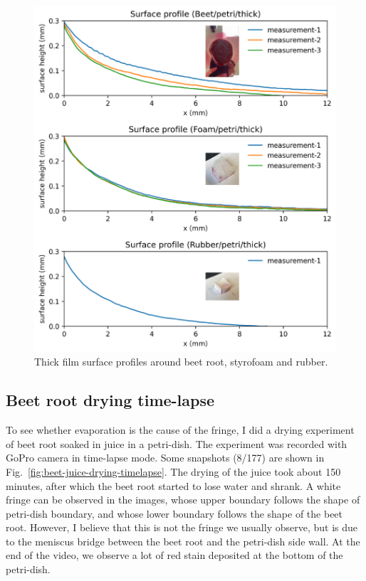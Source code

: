 \documentclass[12pt]{article}
\begin{document}
\begin{figure}
    \centering
    \includegraphics[width=\textwidth]{Figures/surface_profile_measurement_petridish_04042024.pdf}
    \caption{Thick film surface profiles around beet root, styrofoam and rubber.}
    \label{fig:thick-film-surface-profile}
\end{figure}

\subsection{Beet root drying time-lapse}

To see whether evaporation is the cause of the fringe, I did a drying experiment of beet root soaked in juice in a petri-dish. The experiment was recorded with GoPro camera in time-lapse mode. Some snapshots (8/177) are shown in Fig.~\ref{fig:beet-juice-drying-timelapse}. The drying of the juice took about 150 minutes, after which the beet root started to lose water and shrank. A white fringe can be observed in the images, whose upper boundary follows the shape of petri-dish boundary, and whose lower boundary follows the shape of the beet root. However, I believe that this is not the fringe we usually observe, but is due to the meniscus bridge between the beet root and the petri-dish side wall. At the end of the video, we observe a lot of red stain deposited at the bottom of the petri-dish. 
\end{document}
